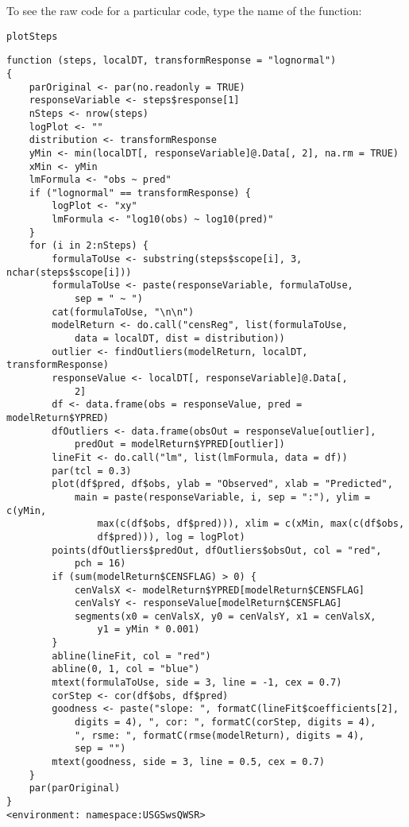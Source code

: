 \documentclass[a4paper,11pt]{article}\usepackage{graphicx, color}
\makeatletter
\newenvironment{kframe}{%
 \def\at@end@of@kframe{}%
 \ifinner\ifhmode%
  \def\at@end@of@kframe{\end{minipage}}%
  \begin{minipage}{\columnwidth}%
 \fi\fi%
 \def\FrameCommand##1{\hskip\@totalleftmargin \hskip-\fboxsep
 \colorbox{shadecolor}{##1}\hskip-\fboxsep
     \hskip-\linewidth \hskip-\@totalleftmargin \hskip\columnwidth}%
 \MakeFramed {\advance\hsize-\width
   \@totalleftmargin\z@ \linewidth\hsize
   \@setminipage}}%
 {\par\unskip\endMakeFramed%
 \at@end@of@kframe}
\newenvironment{knitrout}{}{} %
\makeatother
\begin{document}
To see the raw code for a particular code, type the name of the function:
\begin{knitrout}
\color{fgcolor}\begin{kframe}
\begin{alltt}
plotSteps
\end{alltt}
\begin{verbatim}
function (steps, localDT, transformResponse = "lognormal") 
{
    parOriginal <- par(no.readonly = TRUE)
    responseVariable <- steps$response[1]
    nSteps <- nrow(steps)
    logPlot <- ""
    distribution <- transformResponse
    yMin <- min(localDT[, responseVariable]@.Data[, 2], na.rm = TRUE)
    xMin <- yMin
    lmFormula <- "obs ~ pred"
    if ("lognormal" == transformResponse) {
        logPlot <- "xy"
        lmFormula <- "log10(obs) ~ log10(pred)"
    }
    for (i in 2:nSteps) {
        formulaToUse <- substring(steps$scope[i], 3, nchar(steps$scope[i]))
        formulaToUse <- paste(responseVariable, formulaToUse, 
            sep = " ~ ")
        cat(formulaToUse, "\n\n")
        modelReturn <- do.call("censReg", list(formulaToUse, 
            data = localDT, dist = distribution))
        outlier <- findOutliers(modelReturn, localDT, transformResponse)
        responseValue <- localDT[, responseVariable]@.Data[, 
            2]
        df <- data.frame(obs = responseValue, pred = modelReturn$YPRED)
        dfOutliers <- data.frame(obsOut = responseValue[outlier], 
            predOut = modelReturn$YPRED[outlier])
        lineFit <- do.call("lm", list(lmFormula, data = df))
        par(tcl = 0.3)
        plot(df$pred, df$obs, ylab = "Observed", xlab = "Predicted", 
            main = paste(responseVariable, i, sep = ":"), ylim = c(yMin, 
                max(c(df$obs, df$pred))), xlim = c(xMin, max(c(df$obs, 
                df$pred))), log = logPlot)
        points(dfOutliers$predOut, dfOutliers$obsOut, col = "red", 
            pch = 16)
        if (sum(modelReturn$CENSFLAG) > 0) {
            cenValsX <- modelReturn$YPRED[modelReturn$CENSFLAG]
            cenValsY <- responseValue[modelReturn$CENSFLAG]
            segments(x0 = cenValsX, y0 = cenValsY, x1 = cenValsX, 
                y1 = yMin * 0.001)
        }
        abline(lineFit, col = "red")
        abline(0, 1, col = "blue")
        mtext(formulaToUse, side = 3, line = -1, cex = 0.7)
        corStep <- cor(df$obs, df$pred)
        goodness <- paste("slope: ", formatC(lineFit$coefficients[2], 
            digits = 4), ", cor: ", formatC(corStep, digits = 4), 
            ", rsme: ", formatC(rmse(modelReturn), digits = 4), 
            sep = "")
        mtext(goodness, side = 3, line = 0.5, cex = 0.7)
    }
    par(parOriginal)
}
<environment: namespace:USGSwsQWSR>
\end{verbatim}
\end{kframe}
\end{knitrout}
\end{document}

